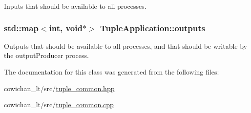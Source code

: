 Inputs that should be available to all processes. \hypertarget{class_tuple_application_8abaaa3ef053827d70b3948e6f855082}{
\subsubsection[{outputs}]{\setlength{\rightskip}{0pt plus 5cm}std::map$<$int, void$\ast$$>$ {\bf TupleApplication::outputs}}}
\label{class_tuple_application_8abaaa3ef053827d70b3948e6f855082}


Outputs that should be available to all processes, and that should be writable by the outputProducer process. 

The documentation for this class was generated from the following files:\begin{CompactItemize}
\item 
cowichan\_\-lt/src/\hyperlink{tuple__common_8hpp}{tuple\_\-common.hpp}\item 
cowichan\_\-lt/src/\hyperlink{tuple__common_8cpp}{tuple\_\-common.cpp}\end{CompactItemize}
